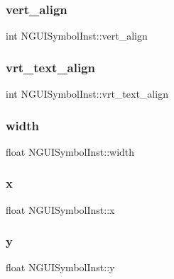 \subsubsection{\texorpdfstring{vert\+\_\+align}{vert\_align}}
{\footnotesize\ttfamily int N\+G\+U\+I\+Symbol\+Inst\+::vert\+\_\+align}

\hypertarget{class_n_g_u_i_symbol_inst_a61a957c21ef7c53e65b26e4e51afd9e6}{}\label{class_n_g_u_i_symbol_inst_a61a957c21ef7c53e65b26e4e51afd9e6} 
\subsubsection{\texorpdfstring{vrt\+\_\+text\+\_\+align}{vrt\_text\_align}}
{\footnotesize\ttfamily int N\+G\+U\+I\+Symbol\+Inst\+::vrt\+\_\+text\+\_\+align}

\hypertarget{class_n_g_u_i_symbol_inst_a0fc697d401fef1258dbf28bbba42a4d7}{}\label{class_n_g_u_i_symbol_inst_a0fc697d401fef1258dbf28bbba42a4d7} 
\subsubsection{\texorpdfstring{width}{width}}
{\footnotesize\ttfamily float N\+G\+U\+I\+Symbol\+Inst\+::width}

\hypertarget{class_n_g_u_i_symbol_inst_a1616f818b1c5b63b2194e01cbeab360d}{}\label{class_n_g_u_i_symbol_inst_a1616f818b1c5b63b2194e01cbeab360d} 
\subsubsection{\texorpdfstring{x}{x}}
{\footnotesize\ttfamily float N\+G\+U\+I\+Symbol\+Inst\+::x}

\hypertarget{class_n_g_u_i_symbol_inst_abcb24ffd0004c8bc11970c869b918250}{}\label{class_n_g_u_i_symbol_inst_abcb24ffd0004c8bc11970c869b918250} 
\subsubsection{\texorpdfstring{y}{y}}
{\footnotesize\ttfamily float N\+G\+U\+I\+Symbol\+Inst\+::y}

